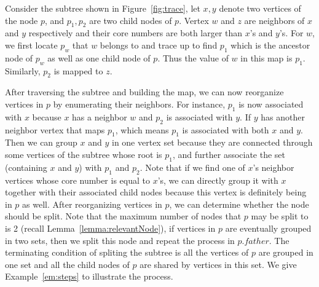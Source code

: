 \begin{example}
\label{em:reorganize}
Consider the subtree shown in Figure~\ref{fig:trace}, let $x,y$ denote two vertices of the node $p$, and $p_1,p_2$ are two child nodes of $p$. Vertex $w$ and $z$ are neighbors of $x$ and $y$ respectively and their core numbers are both larger than $x$'s and $y$'s. For $w$, we first locate $p_w$ that $w$ belongs to and trace up to find $p_1$ which is the ancestor node of $p_w$ as well as one child node of $p$. Thus the value of $w$ in this map is $p_1$. Similarly, $p_2$ is mapped to $z$.
\end{example}
After traversing the subtree and building the map, we can now reorganize vertices in $p$ by enumerating their neighbors. For instance, $p_1$ is now associated with $x$ because $x$ has a neighbor $w$ and $p_2$ is associated with $y$. If $y$ has another neighbor vertex that maps $p_1$, which means $p_1$ is associated with both $x$ and $y$. Then we can group $x$ and $y$ in one vertex set because they are connected through some vertices of the subtree whose root is $p_1$, and further associate the set (containing $x$ and $y$) with $p_1$ and $p_2$. Note that if we find one of $x$'s neighbor vertices whose core number is equal to $x$'s, we can directly group it with $x$ together with their associated child nodes because this vertex is definitely being in $p$ as well. 
After reorganizing vertices in $p$, we can determine whether the node should be split. Note that the maximum number of nodes that $p$ may be split to is 2 (recall Lemma~\ref{lemma:relevantNode}), if vertices in $p$ are eventually grouped in two sets, then we split this node and repeat the process in $p.father$. 
The terminating condition of spliting the subtree is all the vertices of $p$ are grouped in one set and all the child nodes of $p$ are shared by vertices in this set. We give Example~\ref{em:steps} to illustrate the process.


